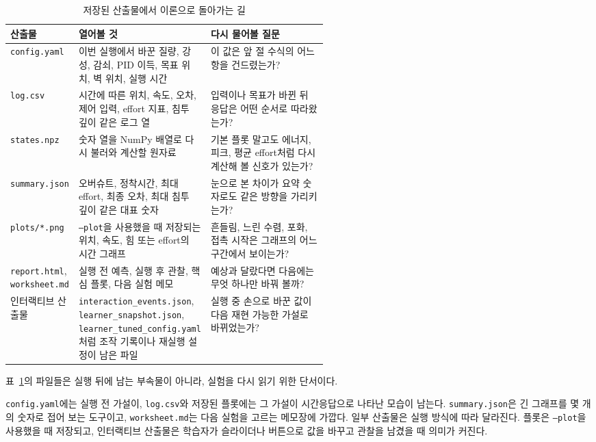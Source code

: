 \begin{table}[H]
  \centering
  \caption{저장된 산출물에서 이론으로 돌아가는 길}
  \label{tab:artifact-theory-bridge}
  \small
  \setlength{\tabcolsep}{4pt}
  \renewcommand{\arraystretch}{1.12}
  \begin{tabularx}{\linewidth}{@{}>{\raggedright\arraybackslash}p{0.21\linewidth}>{\raggedright\arraybackslash}p{0.33\linewidth}>{\raggedright\arraybackslash}X@{}}
    \toprule
    산출물 & 열어볼 것 & 다시 물어볼 질문 \\
    \midrule
    \texttt{config.yaml} & 이번 실행에서 바꾼 질량, 강성, 감쇠, PID 이득, 목표 위치, 벽 위치, 실행 시간 & 이 값은 앞 절 수식의 어느 항을 건드렸는가? \\
    \texttt{log.csv} & 시간에 따른 위치, 속도, 오차, 제어 입력, effort 지표, 침투 깊이 같은 로그 열 & 입력이나 목표가 바뀐 뒤 응답은 어떤 순서로 따라왔는가? \\
    \texttt{states.npz} & 숫자 열을 NumPy 배열로 다시 불러와 계산할 원자료 & 기본 플롯 말고도 에너지, 피크, 평균 effort처럼 다시 계산해 볼 신호가 있는가? \\
    \texttt{summary.json} & 오버슈트, 정착시간, 최대 effort, 최종 오차, 최대 침투 깊이 같은 대표 숫자 & 눈으로 본 차이가 요약 숫자로도 같은 방향을 가리키는가? \\
    \texttt{plots/*.png} & \texttt{--plot}을 사용했을 때 저장되는 위치, 속도, 힘 또는 effort의 시간 그래프 & 흔들림, 느린 수렴, 포화, 접촉 시작은 그래프의 어느 구간에서 보이는가? \\
    \texttt{report.html}, \texttt{worksheet.md} & 실행 전 예측, 실행 후 관찰, 핵심 플롯, 다음 실험 메모 & 예상과 달랐다면 다음에는 무엇 하나만 바꿔 볼까? \\
    인터랙티브 산출물 & \texttt{interaction\_events.json}, \texttt{learner\_snapshot.json}, \texttt{learner\_tuned\_config.yaml}처럼 조작 기록이나 재실행 설정이 남은 파일 & 실행 중 손으로 바꾼 값이 다음 재현 가능한 가설로 바뀌었는가? \\
    \bottomrule
  \end{tabularx}
\end{table}

표~\ref{tab:artifact-theory-bridge}의 파일들은 실행 뒤에 남는 부속물이 아니라, 실험을 다시 읽기 위한 단서이다.

\texttt{config.yaml}에는 실행 전 가설이, \texttt{log.csv}와 저장된 플롯에는 그 가설이 시간응답으로 나타난 모습이 남는다.
\texttt{summary.json}은 긴 그래프를 몇 개의 숫자로 접어 보는 도구이고, \texttt{worksheet.md}는 다음 실험을 고르는 메모장에 가깝다.
일부 산출물은 실행 방식에 따라 달라진다.
플롯은 \texttt{--plot}을 사용했을 때 저장되고, 인터랙티브 산출물은 학습자가 슬라이더나 버튼으로 값을 바꾸고 관찰을 남겼을 때 의미가 커진다.

